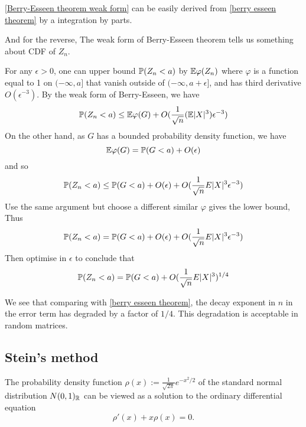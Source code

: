 \ref{Berry-Esseen theorem weak form} can be easily derived from \ref{berry esseen theorem} by a integration by parts. 

And for the reverse, The weak form of Berry-Esseen theorem tells us something about CDF of $Z_n$.

For any $\epsilon > 0$, one can upper bound $\mathbb{P}(Z_n<a)$ by $\mathbb{E} \varphi(Z_n)$ where $\varphi$ is a function equal to 1 on $(-\infty,a]$ that vanish outside of $(-\infty,a+\epsilon]$, and has third derivative $O(\epsilon^{-3})$. By the weak form of Berry-Esseen, we have 
\begin{equation*}
    \mathbb{P}(Z_n<a)\leq \mathbb{E} \varphi(G)+O(\frac{1}{\sqrt{n}}(\mathbb{E} |X|^3)\epsilon^{-3})
\end{equation*}
On the other hand, as $G$ has a bounded probability density function, we have
\begin{equation*}
    \mathbb{E} \varphi(G) = \mathbb{P}(G<a)+O(\epsilon)
\end{equation*}
and so 
\begin{equation*}
    \mathbb{P}(Z_n <a)\leq \mathbb{P}(G<a)+O(\epsilon)+O(\frac{1}{\sqrt{n}}E|X|^3\epsilon^{-3})
\end{equation*}
Use the same argument but choose a different similar $\varphi$ gives the lower bound, Thus
\begin{equation*}
    \mathbb{P}(Z_n <a)= \mathbb{P}(G<a)+O(\epsilon)+O(\frac{1}{\sqrt{n}}E|X|^3\epsilon^{-3})
\end{equation*}
Then optimise in $\epsilon$ to conclude that 
\begin{equation}\label{Weak to general berry esseen}
    \mathbb{P}(Z_n<a) = \mathbb{P}(G<a)+O(\frac{1}{\sqrt{n}}E|X|^3)^{1/4}
\end{equation}

We see that comparing with \ref{berry esseen theorem}, the decay exponent in $n$ in the error term has degraded by a factor of $1/4$. This degradation is acceptable in random matrices.

\subsection{Stein's method}

The probability density function $\rho(x) := \frac{1}{\sqrt{2\pi}}e^{-x^2/2} $ of the standard normal distribution $N(0,1)_{\mathbb{R}}$ can be viewed as a solution to the ordinary differential equation
\begin{equation}
    \label{differential equation result in gaussian density}
    \rho'(x)+x\rho(x)=0.
\end{equation}

